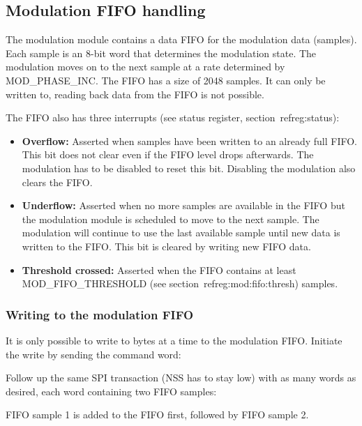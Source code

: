 \documentclass{article}
\newcommand{\bitrect}[2]{
  \begin{pgfonlayer}{foreground}
    \draw [thick] (0,0) rectangle (#1,1);
    \pgfmathsetmacro\result{#1-1}
    \foreach \x in {1,...,\result}
      \draw [thick] (\x,1) -- (\x, 0.8);
  \end{pgfonlayer}
  \bitlabels{#1}{#2}
}
\newcommand{\rwbits}[3]{
  \draw [thick] (#1,0) rectangle ++(#2,1) node[pos=0.5]{#3};
  \pgfmathsetmacro\start{#1+0.5}
  \pgfmathsetmacro\finish{#1+#2-0.5}
}
\newcommand{\robits}[3]{
  \begin{pgfonlayer}{background}
    \draw [thick, fill=lightgray] (#1,0) rectangle ++(#2,1) node[pos=0.5]{#3};
  \end{pgfonlayer}
  \pgfmathsetmacro\start{#1+0.5}
  \pgfmathsetmacro\finish{#1+#2-0.5}
}
\newcommand{\bitlabels}[2]{
  \foreach \bit in {1,...,#1}{
     \pgfmathsetmacro\result{#2}
     \node [above] at (\bit-0.5, 1) {\pgfmathprintnumber{\result}};
   }
}
\begin{document}
\subsection{Modulation FIFO handling}
\label{mod:fifo}
The modulation module contains a data FIFO for the modulation data (samples). Each sample is an 8-bit word that determines the modulation state. The modulation moves on to the next sample at a rate determined by MOD\_PHASE\_INC. The FIFO has a size of 2048 samples. It can only be written to, reading back data from the FIFO is not possible.

The FIFO also has three interrupts (see status register, section~ref{reg:status}):
\begin{itemize}
\item \textbf{Overflow:} Asserted when samples have been written to an already full FIFO. This bit does not clear even if the FIFO level drops afterwards. The modulation has to be disabled to reset this bit. Disabling the modulation also clears the FIFO.
\item \textbf{Underflow:} Asserted when no more samples are available in the FIFO but the modulation module is scheduled to move to the next sample. The modulation will continue to use the last available sample until new data is written to the FIFO. This bit is cleared by writing new FIFO data.
\item \textbf{Threshold crossed:} Asserted when the FIFO contains at least MOD\_FIFO\_THRESHOLD (see section~ref{reg:mod:fifo:thresh}) samples.
\end{itemize}

\subsubsection{Writing to the modulation FIFO}
It is only possible to write to bytes at a time to the modulation FIFO. Initiate the write by sending the command word:
\begin{center}
\end{center}
Follow up the same SPI transaction (NSS has to stay low) with as many words as desired, each word containing two FIFO samples:
\begin{center}
\end{center}
FIFO sample 1 is added to the FIFO first, followed by FIFO sample 2.
\end{document}
